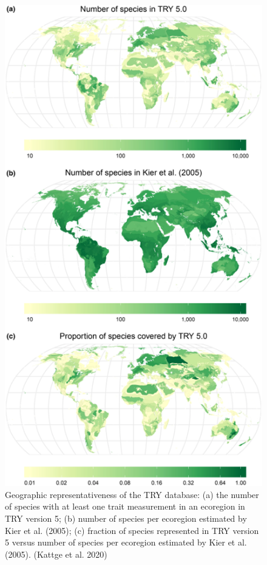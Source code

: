 \documentclass[12pt,oneside]{book}
\begin{document}
\begin{figure}

{\centering \includegraphics[width=0.8\linewidth]{figures/chap7/f79_try_kier} 

}

\caption{Geographic representativeness of the TRY database: (a) the number of species with at least one trait measurement in an ecoregion in TRY version 5; (b) number of species per ecoregion estimated by Kier et al. (2005); (c) fraction of species represented in TRY version 5 versus number of species per ecoregion estimated by Kier et al. (2005). (Kattge et al. 2020)}\label{fig:f79}
\end{figure}
\end{document}
